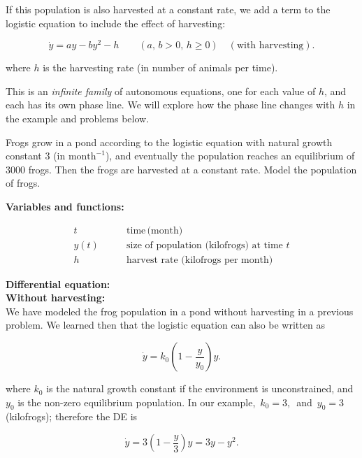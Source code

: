 If this population is also harvested at a constant rate,
we add a term to the logistic equation to include the effect of harvesting:

\begin{equation*}
  \dot y = ay - by^2  - h \qquad (a,\, b > 0,\, h \geq 0) \quad (\text{with harvesting}). 
\end{equation*}

where $h$ is the harvesting rate (in number of animals per time).

This is an \emph{infinite family} of autonomous equations,
one for each value of $h$, and each has its own phase line.
We will explore how the phase line changes with $h$ in the example and problems below.

\begin{example}
  Frogs grow in a pond according to the logistic equation
  with natural growth constant $3$ (in $\text{month}^{−1}$),
  and eventually the population reaches an equilibrium of $3000$ frogs.
  Then the frogs are harvested at a constant rate. Model the population of frogs.
\end{example}

\textbf{\color{blue} Variables and functions:}

\begin{align*}
  t &\qquad \text{time}\, \text{(month)} \\
  y(t) &\qquad \text{size of population (kilofrogs) at time $t$} \\
  h &\qquad \text{harvest rate (kilofrogs per month)}
\end{align*}

\textbf{\color{blue} Differential equation:} \\
\textbf{Without harvesting:} \\
We have modeled the frog population in a pond without harvesting in a previous problem.
We learned then that the logistic equation can also be written as

\begin{equation*}
  \dot y = k_0 \left( 1 - \frac{y}{y_0} \right) y. 
\end{equation*}

where $k_0$ is the natural growth constant
if the environment is unconstrained, and $y_0$ is the non-zero equilibrium population.
In our example, $\,k_0 = 3,\,$ and $\, y_0 = 3\,$ (kilofrogs); therefore the DE is

\begin{equation*}
  \dot y = 3 \left( 1 - \frac{y}{3} \right) y = 3y - y^2. 
\end{equation*}

